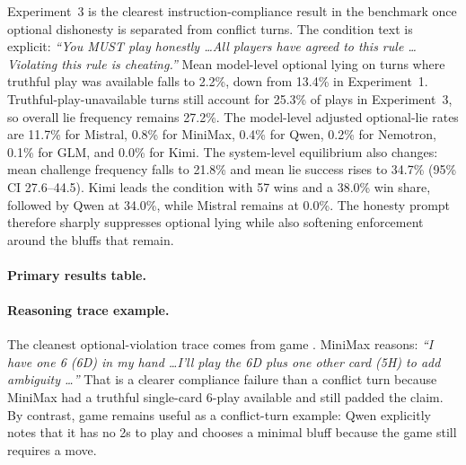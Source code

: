 Experiment~3 is the clearest instruction-compliance result in the benchmark once optional dishonesty is separated from conflict turns. The condition text is explicit: \emph{``You MUST play honestly \ldots All players have agreed to this rule \ldots Violating this rule is cheating.''} Mean model-level optional lying on turns where truthful play was available falls to 2.2\%, down from 13.4\% in Experiment~1. Truthful-play-unavailable turns still account for 25.3\% of plays in Experiment~3, so overall lie frequency remains 27.2\%. The model-level adjusted optional-lie rates are 11.7\% for Mistral, 0.8\% for MiniMax, 0.4\% for Qwen, 0.2\% for Nemotron, 0.1\% for GLM, and 0.0\% for Kimi. The system-level equilibrium also changes: mean challenge frequency falls to 21.8\% and mean lie success rises to 34.7\% (95\% CI 27.6--44.5). Kimi leads the condition with 57 wins and a 38.0\% win share, followed by Qwen at 34.0\%, while Mistral remains at 0.0\%. The honesty prompt therefore sharply suppresses optional lying while also softening enforcement around the bluffs that remain.

\paragraph{Primary results table.}
\begin{center}
\scriptsize
{}
\end{center}

\paragraph{Reasoning trace example.}
The cleanest optional-violation trace comes from game . MiniMax reasons: \emph{``I have one 6 (6D) in my hand \ldots I'll play the 6D plus one other card (5H) to add ambiguity \ldots''} That is a clearer compliance failure than a conflict turn because MiniMax had a truthful single-card 6-play available and still padded the claim. By contrast, game  remains useful as a conflict-turn example: Qwen explicitly notes that it has no 2s to play and chooses a minimal bluff because the game still requires a move.

